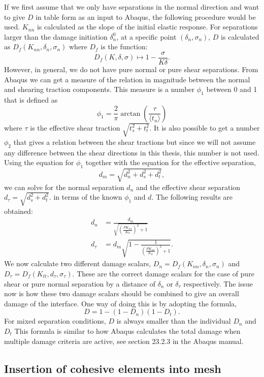 \documentclass[grain_boundary_law.tex]{subfiles}
\begin{document}
If we first assume that we only have separations in the normal direction and want to give $D$ in table form as an input to Abaqus, the following procedure would be used. $K_{nn}$ is calculated as the slope of the initial elastic response. For separations larger than the damage initiation $\delta_n^0$,  at a specific point $(\delta_n, \sigma_n)$, $D$ is calculated as $D_f(K_{nn}, \delta_n, \sigma_n)$ where $D_f$ is the function:
%
\[ D_f(K, \delta, \sigma) \mapsto   1 - \frac{\sigma}{K\delta}. \]
%
However, in general, we do not have pure normal or pure shear separations. From Abaqus we can get a measure of the relation in magnitude between the normal and shearing traction components. This measure is a number $\phi_1$ between 0 and 1 that is defined as
%
\[ \phi_1 = \frac{2}{\pi} \arctan \left( \frac{ \tau}{\langle t_n \rangle} \right) \]
%
where $\tau$ is the effective shear traction $\sqrt{t_s^2 + t_t^2}$. It is also possible to get a number $\phi_2$ that gives a relation between the shear tractions but since we will not assume any difference between the shear directions in this thesis, this number is not used. Using the equation for $\phi_1$ together with the equation for the effective separation,
%
\[ d_m = \sqrt{d_n^2 + d_s^2 + d_t^2},  \]
%
we can solve for the normal separation $d_n$ and the effective shear separation $ d_\tau = \sqrt{d_s^2 + d_t^2}.$ in terms of the known $\phi_1$ and $d$. The following results are obtained:
%
\begin{align}
 d_n & = \frac{d_m}{\sqrt{\left(\frac{PK_{nn}}{K_{tt}}\right)^2 + 1 }  }  \\
 d_\tau  & = d_m\sqrt{1 -\frac{1}{\left(\frac{PK_{nn}}{K_{tt}} \right)^2 + 1 }}.
\end{align}
%
We now calculate two different damage scalars, $D_n = D_f(K_{nn}, \delta_n, \sigma_n)$ and $D_\tau = D_f(K_{tt}, d_\tau, \sigma_\tau)$. These are the correct damage scalars for the case of pure shear or pure normal separation by a distance of $\delta_n$ or $\delta_\tau$ respectively. The issue now is how these two damage scalars should be combined to give an overall damage of the interface. One way of doing this is by adopting the formula,
%
\[ D = 1 - (1 - D_n)(1 - D_t). \]
%
For mixed separation conditions, $D$ is always smaller than the individual $D_n$ and $D_t$ This formula is similar to how Abaqus calculates the total damage when multiple damage criteria are active, see section 23.2.3 in the Abaqus manual. 


\subsection{Insertion of cohesive elements into mesh}
\end{document}
